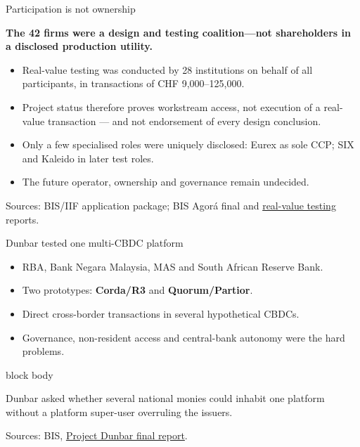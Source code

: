 \documentclass[aspectratio=169,12pt]{beamer}
\newcommand{\rust}[1]{\textcolor{Rust}{\textbf{#1}}}
\newcommand{\blue}[1]{\textcolor{Ocean}{\textbf{#1}}}
\newcommand{\claim}[1]{\begin{center}\fontsize{16}{19}\selectfont\bfseries #1\end{center}}
\newcommand{\source}[1]{\vfill\par\fontsize{5.4}{6.5}\selectfont\color{Quiet}Sources: #1}
\newcommand{\tightitems}{\setlength{\itemsep}{0.42em}\setlength{\parskip}{0pt}}
\newenvironment{statement}{%
  \begin{beamercolorbox}[sep=.18cm,rounded=false,wd=\linewidth]{block body}%
  \fontsize{13}{15.5}\selectfont\bfseries
}{\end{beamercolorbox}}
\begin{document}
\begin{frame}{Participation is not ownership}
  \claim{The 42 firms were a design and testing coalition---not shareholders in a disclosed production utility.}
  \vspace{0.25cm}
  \begin{itemize}\tightitems
    \item Real-value testing was conducted by 28 institutions on behalf of all participants, in transactions of CHF 9,000--125,000.
    \item Project status therefore proves workstream access, not execution of a real-value transaction --- and not endorsement of every design conclusion.
    \item Only a few specialised roles were uniquely disclosed: Eurex as sole CCP; SIX and Kaleido in later test roles.
    \item The future operator, ownership and governance remain undecided.
  \end{itemize}
  \source{BIS/IIF application package; BIS Agor\'a final and \href{https://www.bis.org/about/bisih/topics/fmis/agora/rvt.htm}{real-value testing} reports.}
\end{frame}

\begin{frame}{Dunbar tested one multi-CBDC platform} %
  \begin{itemize}\tightitems
    \item RBA, Bank Negara Malaysia, MAS and South African Reserve Bank.
    \item Two prototypes: \rust{Corda/R3} and \blue{Quorum/Partior}.
    \item Direct cross-border transactions in several hypothetical CBDCs.
    \item Governance, non-resident access and central-bank autonomy were the hard problems.
  \end{itemize}
  \begin{statement}
    Dunbar asked whether several national monies could inhabit one platform without a platform super-user overruling the issuers.
  \end{statement}
  \source{BIS, \href{https://www.bis.org/publ/othp47.htm}{Project Dunbar final report}.}
\end{frame}
\end{document}

